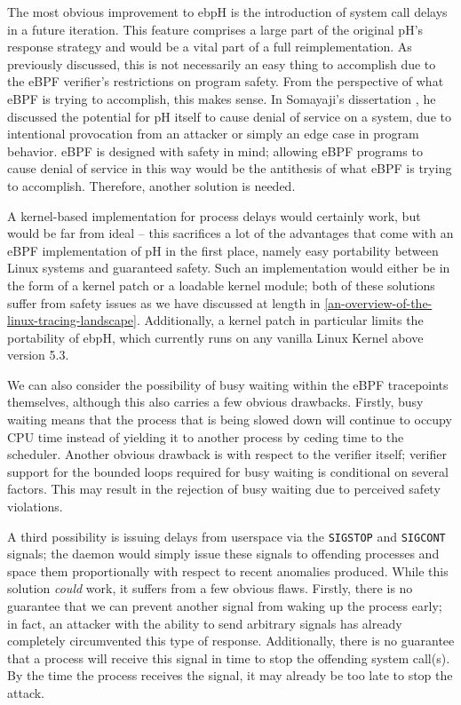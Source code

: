 \documentclass[
  12pt]{findlay}
\newcommand{\passthrough}[1]{#1}
\begin{document}
The most obvious improvement to ebpH is the introduction of system call
delays in a future iteration. This feature comprises a large part of the
original pH's response strategy and would be a vital part of a full
reimplementation. As previously discussed, this is not necessarily an
easy thing to accomplish due to the eBPF verifier's restrictions on
program safety. From the perspective of what eBPF is trying to
accomplish, this makes sense. In Somayaji's dissertation
\autocite{soma02}, he discussed the potential for pH itself to cause
denial of service on a system, due to intentional provocation from an
attacker or simply an edge case in program behavior. eBPF is designed
with safety in mind; allowing eBPF programs to cause denial of service
in this way would be the antithesis of what eBPF is trying to
accomplish. Therefore, another solution is needed.

A kernel-based implementation for process delays would certainly work,
but would be far from ideal -- this sacrifices a lot of the advantages
that come with an eBPF implementation of pH in the first place, namely
easy portability between Linux systems and guaranteed safety. Such an
implementation would either be in the form of a kernel patch or a
loadable kernel module; both of these solutions suffer from safety
issues as we have discussed at length in
\autoref{an-overview-of-the-linux-tracing-landscape}. Additionally, a
kernel patch in particular limits the portability of ebpH, which
currently runs on any vanilla Linux Kernel above version 5.3.

We can also consider the possibility of busy waiting within the eBPF
tracepoints themselves, although this also carries a few obvious
drawbacks. Firstly, busy waiting means that the process that is being
slowed down will continue to occupy CPU time instead of yielding it to
another process by ceding time to the scheduler. Another obvious
drawback is with respect to the verifier itself; verifier support for
the bounded loops required for busy waiting is conditional on several
factors. This may result in the rejection of busy waiting due to
perceived safety violations.

A third possibility is issuing delays from userspace via the
\passthrough{\lstinline!SIGSTOP!} and \passthrough{\lstinline!SIGCONT!}
signals; the daemon would simply issue these signals to offending
processes and space them proportionally with respect to recent anomalies
produced. While this solution \emph{could} work, it suffers from a few
obvious flaws. Firstly, there is no guarantee that we can prevent
another signal from waking up the process early; in fact, an attacker
with the ability to send arbitrary signals has already completely
circumvented this type of response. Additionally, there is no guarantee
that a process will receive this signal in time to stop the offending
system call(s). By the time the process receives the signal, it may
already be too late to stop the attack.
\end{document}

